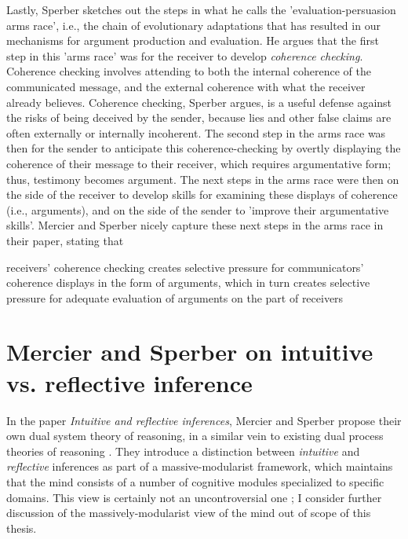 Lastly, Sperber sketches out the steps in what he calls the 'evaluation-persuasion arms race', i.e., the chain of evolutionary adaptations that has resulted in our mechanisms for argument production and evaluation.
He argues that the first step in this 'arms race' was for the receiver to develop \emph{coherence checking}. Coherence checking involves attending to both the internal coherence of the communicated message, and the external coherence with what the receiver already believes. Coherence checking, Sperber argues, is a useful defense against the risks of being deceived by the sender, because lies and other false claims are often externally or internally incoherent.
The second step in the arms race was then for the sender to anticipate this coherence-checking by overtly displaying the coherence of their message to their receiver, which requires argumentative form; thus, testimony becomes argument.
The next steps in the arms race were then on the side of the receiver to develop skills for examining these displays of coherence (i.e., arguments), and on the side of the sender to 'improve their argumentative skills'.
Mercier and Sperber nicely capture these next steps in the arms race in their \citeyear{MS11} paper, stating that
\begin{quoting}
    receivers' coherence checking creates selective pressure for communicators' coherence displays in the form of arguments, which in turn creates selective pressure for adequate evaluation of arguments on the part of receivers
\end{quoting}

\section{Mercier and Sperber on intuitive vs. reflective inference}
\label{sec:MS09}

In the \citeyear{MS09} paper \emph{Intuitive and reflective inferences}, Mercier and Sperber propose their own dual system theory of reasoning, in a similar vein to existing dual process theories of reasoning \citep{Sloman96, Evans03, Evans13, Kahneman11}.
They introduce a distinction between \emph{intuitive} and \emph{reflective} inferences as part of a massive-modularist framework, which maintains that the mind consists of a number of cognitive modules specialized to specific domains.
This view is certainly not an uncontroversial one \citep[cf.][\S 3.1]{Novaes18}; I consider further discussion of the massively-modularist view of the mind out of scope of this thesis.

